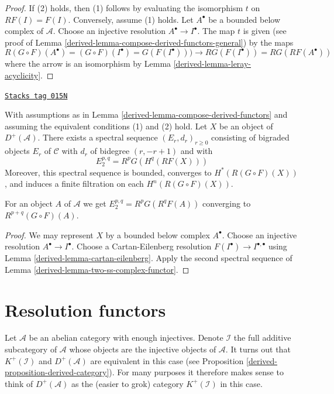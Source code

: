 \begin{proof}

If (2) holds, then (1) follows by evaluating the isomorphism
$t$ on $RF(I) = F(I)$. Conversely, assume (1) holds.
Let $A^\bullet$ be a bounded below complex of $\mathcal{A}$.
Choose an injective resolution $A^\bullet \to I^\bullet$.
The map $t$ is given (see proof of
Lemma \ref{derived-lemma-compose-derived-functors-general})
by the maps
$$
R(G \circ F)(A^\bullet) =
(G \circ F)(I^\bullet) =
G(F(I^\bullet))) \to
RG(F(I^\bullet)) =
RG(RF(A^\bullet))
$$
where the arrow is an isomorphism by
Lemma \ref{derived-lemma-leray-acyclicity}.
\end{proof}

\begin{lemma}

\label{derived-lemma-grothendieck-spectral-sequence}
\href{https://stacks.math.columbia.edu/tag/015N}{\texttt{Stacks tag 015N}}

With assumptions as in Lemma \ref{derived-lemma-compose-derived-functors}
and assuming the equivalent conditions (1) and (2) hold.
Let $X$ be an object of $D^{+}(\mathcal{A})$.
There exists a spectral sequence $(E_r, d_r)_{r \geq 0}$
consisting of bigraded objects $E_r$ of $\mathcal{C}$ with
$d_r$ of bidegree $(r, - r + 1)$ and with
$$
E_2^{p, q} = R^pG(H^q(RF(X)))
$$
Moreover, this spectral sequence is bounded, converges to
$H^*(R(G \circ F)(X))$, and induces a finite filtration
on each $H^n(R(G \circ F)(X))$.
\end{lemma}

For an object $A$ of $\mathcal{A}$ we get
$E_2^{p, q} = R^pG(R^qF(A))$ converging to $R^{p + q}(G \circ F)(A)$.

\begin{proof}

We may represent $X$ by a bounded below complex $A^\bullet$.
Choose an injective resolution $A^\bullet \to I^\bullet$.
Choose a Cartan-Eilenberg resolution
$F(I^\bullet) \to I^{\bullet, \bullet}$ using
Lemma \ref{derived-lemma-cartan-eilenberg}.
Apply the second spectral sequence of
Lemma \ref{derived-lemma-two-ss-complex-functor}.
\end{proof}

\section{Resolution functors}
\label{derived-section-derived-category}
Let $\mathcal{A}$ be an abelian category with enough injectives.
Denote $\mathcal{I}$ the full additive subcategory of $\mathcal{A}$ whose
objects are the injective objects of $\mathcal{A}$.
It turns out that $K^{+}(\mathcal{I})$ and $D^{+}(\mathcal{A})$
are equivalent in this case (see
Proposition \ref{derived-proposition-derived-category}).
For many purposes it therefore makes sense to think of
$D^{+}(\mathcal{A})$ as the (easier to grok) category $K^{+}(\mathcal{I})$
in this case.

